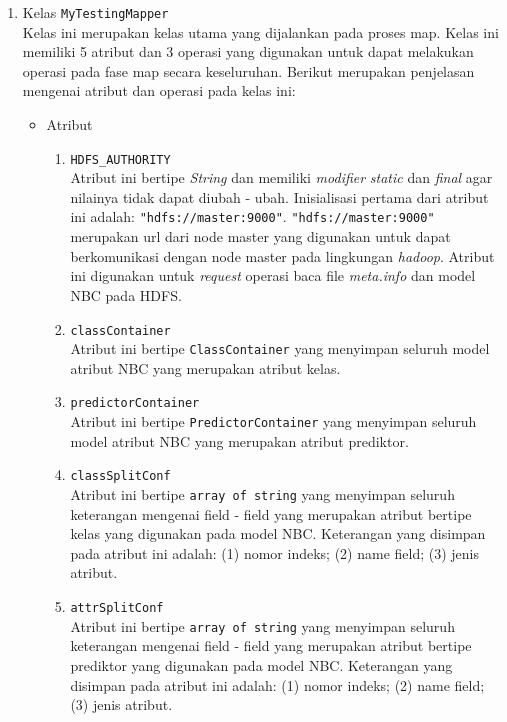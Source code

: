 \begin{enumerate}
	\item{Kelas \texttt{MyTestingMapper}}\\
	Kelas ini merupakan kelas utama yang dijalankan pada proses map. Kelas ini memiliki 5 atribut dan 3 operasi yang digunakan untuk dapat melakukan operasi pada fase map secara keseluruhan. Berikut merupakan penjelasan mengenai atribut dan operasi pada kelas ini:
	\begin{itemize}
		\item{Atribut}
		\begin{enumerate}
			\item{\verb|HDFS_AUTHORITY|}\\
		Atribut ini bertipe \textit{String} dan memiliki \textit{modifier} \textit{static} dan \textit{final} agar nilainya tidak dapat diubah - ubah. Inisialisasi pertama dari atribut ini adalah: \verb|"hdfs://master:9000"|. \verb|"hdfs://master:9000"| merupakan url dari node master yang digunakan untuk dapat berkomunikasi dengan node master pada lingkungan \textit{hadoop}. Atribut ini digunakan untuk \textit{request} operasi baca file \textit{meta.info} dan model NBC pada HDFS.
		
		\item{\texttt{classContainer}}\\
		Atribut ini bertipe \texttt{ClassContainer} yang menyimpan seluruh model atribut NBC yang merupakan atribut kelas. 

		\item{\texttt{predictorContainer}}\\
		Atribut ini bertipe \texttt{PredictorContainer} yang menyimpan seluruh model atribut NBC yang merupakan atribut prediktor. 

		\item{\texttt{classSplitConf}}\\
		Atribut ini bertipe \texttt{array of string} yang menyimpan seluruh keterangan mengenai field - field yang merupakan atribut bertipe kelas yang digunakan pada model NBC. Keterangan yang disimpan pada atribut ini adalah: (1) nomor indeks; (2) name field; (3) jenis atribut. 

		\item{\texttt{attrSplitConf}}\\
		Atribut ini bertipe \texttt{array of string} yang menyimpan seluruh keterangan mengenai field - field yang merupakan atribut bertipe prediktor yang digunakan pada model NBC. Keterangan yang disimpan pada atribut ini adalah: (1) nomor indeks; (2) name field; (3) jenis atribut.
		

\end{enumerate}
\end{itemize}
\end{enumerate}
